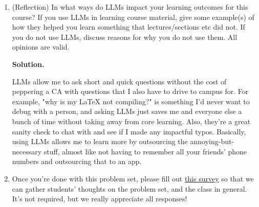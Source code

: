 \documentclass[11pt]{article}
\newenvironment{soln}{%
  \par\medskip\noindent\begingroup\color{blue}\textbf{Solution.}\ %
}{%
  \endgroup\par\medskip%
}
\newcommand{\solRec}{\textbf{Recommendation: }}
\newcommand{\solUse}{\textbf{How I would use my data structure/algorithm: }}
\newcommand{\solTime}{\textbf{Runtime: }}
\begin{document}
\begin{enumerate}
\begin{enumerate}
\begin{soln}
\begin{enumerate}[label=(\roman*)]
    \item \solRec I'm just gonna let myself use multiple data structures here, since otherwise runtime would suffer. We use one hash map and one balanced BST. This trades $O(n)$ more storage for asymptotically faster queries.
    \item \solUse The balanced BST uses $\bday$ as keys and has no values, and the hash map uses $\id$ for keys and $\bday$ for values with a max load factor of 1 and a starting $m=2n$. After preprocessing everyone, each update goes like this: (1) inserting $(\id,\bday)$ means checking that $\id$ doesn't exist in the hash map yet, inserting $\bday$ into the BST, then inserting $(\id, \bday)$ into the hash map, and (2) deleting $\id$ means searching the hash map for $\id$ and making sure it exists, then deleting the corresponding $\bday$ from the BST, and then deleting $\id$ from the hash map. At the end of each day, we use the same strategy as 1b to report quantiles.
    \item \solTime Preprocessing takes $O(n)+O(n\log n)=O(n\log n)$ for the hash map and BST. Each update takes an expected $O(1)+O(\log(n+u)+O(1))=O(\log(n+u))$ to validate $\id$, insert or delete from the BST, and then insert or delete from the hash map. We have $s=3$ stats to report, with each taking $O(\log(n+u))$. This means that daily expected runtime is $u\cdot O(\log(n+u))+3\cdot O(\log(n+u))=O((u+3)\cdot\log(n+u))$. With $0<u\leq n$, this simplifies to $O(u\cdot\log n)$.
\end{enumerate}
\end{soln}

\end{enumerate}

\item (Reflection) In what ways do LLMs impact your learning outcomes for this course? If you use LLMs in learning course material, give some example(s) of how they helped you learn something that lectures/sections etc did not. If you do not use LLMs, discuss reasons for why you do not use them. All opinions are valid.

\begin{soln}
LLMs allow me to ask short and quick questions without the cost of peppering a CA with questions that I also have to drive to campus for. For example, "why is my LaTeX not compiling?" is something I'd never want to debug with a person, and asking LLMs just saves me and everyone else a bunch of time without taking away from core learning. Also, they're a great sanity check to chat with and see if I made any impactful typos. Basically, using LLMs allows me to learn more by outsourcing the annoying-but-necessary stuff, almost like not having to remember all your friends' phone numbers and outsourcing that to an app.
\end{soln}

\item Once you're done with this problem set, please fill out \href{https://forms.gle/2577vuBRmnu4ugWt6}{this survey} so that we can gather students' thoughts on the problem set, and the class in general. It's not required, but we really appreciate all responses!

\end{enumerate}
\end{document}
